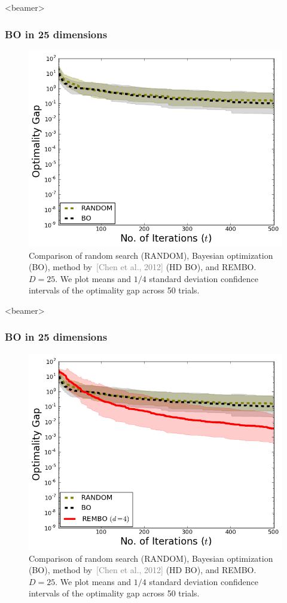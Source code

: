 \documentclass[grey]{beamer}
\begin{document}
 \begin{frame}<beamer>
 \frametitle{BO in 25 dimensions}
 \begin{figure}
   \includegraphics[width=0.6\columnwidth]{./figs/branin_dis2.png}
    \caption{Comparison of random search (RANDOM), Bayesian optimization (BO),
     method by~\textcolor{gray}{[Chen et al., 2012]} (HD BO), and REMBO.
     $D=25$. We plot means and $1/4$ 
     standard deviation confidence intervals of the optimality gap across 50 trials.}
   \label{fig:standard}
  \end{figure}
 \end{frame}
 
 
 \begin{frame}<beamer>
 \frametitle{BO in 25 dimensions}
 \begin{figure}
   \includegraphics[width=0.6\columnwidth]{./figs/branin_dis3.png}
    \caption{Comparison of random search (RANDOM), Bayesian optimization (BO),
     method by~\textcolor{gray}{[Chen et al., 2012]} (HD BO), and REMBO.
     $D=25$. We plot means and $1/4$ 
     standard deviation confidence intervals of the optimality gap across 50 trials.}
   \label{fig:standard}
  \end{figure}
 \end{frame}
 
\end{document}
